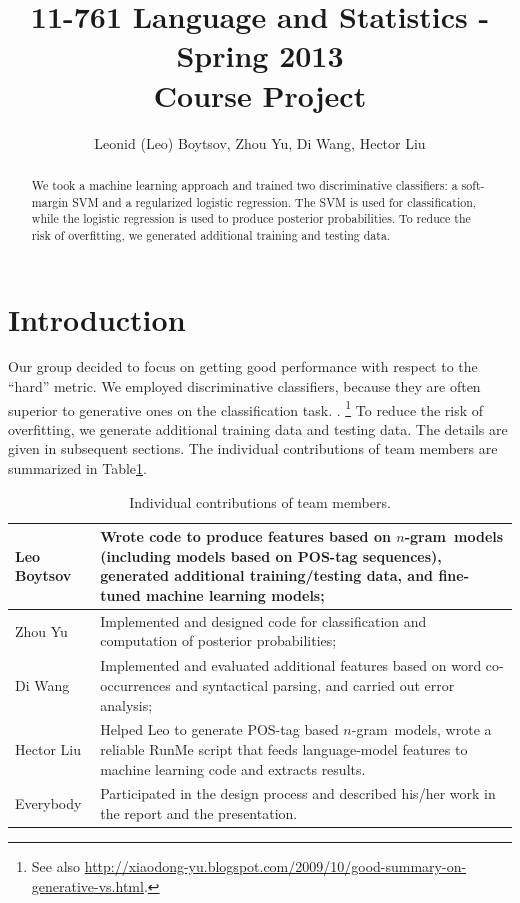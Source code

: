 \documentclass[11pt]{article}
\newcommand{\ngram}{\mbox{$n$-gram }}
\begin{document}
\title{11-761 Language and Statistics - Spring 2013\\
Course Project}
\author{Leonid (Leo) Boytsov, Zhou Yu, Di Wang, Hector Liu}
\date{}
\maketitle

\begin{abstract}
We took a machine learning approach and trained two discriminative classifiers:
a soft-margin SVM and a regularized logistic regression.
The SVM is used for classification, while the logistic regression is used to produce posterior probabilities.
To reduce the risk of overfitting, we generated additional training and testing data.
\end{abstract}

\section{Introduction}
Our group decided to focus on getting good performance with respect to the ``hard'' metric.
We employed discriminative classifiers,
because they are often superior to generative ones on the classification task. \cite{bishop2007generative}.
\footnote{See also \url{http://xiaodong-yu.blogspot.com/2009/10/good-summary-on-generative-vs.html}.}
To reduce the risk of overfitting, we generate additional training data and testing data.
The details are given in subsequent sections. The individual contributions of team members are summarized in Table\ref{TableContrib}.

\begin{table}[H]
\begin{tabular}{p{1in}|p{5in}}
\hline
Leo Boytsov &  Wrote code to produce features based on \ngram models (including models based on POS-tag sequences), generated additional training/testing data, and fine-tuned machine learning models;
\\\hline
Zhou Yu & Implemented and designed code for classification and computation of posterior probabilities;
\\\hline
Di Wang & Implemented and evaluated additional features based on word co-occurrences and syntactical parsing, and
carried out error analysis;
\\\hline
Hector Liu & Helped Leo to generate POS-tag based \ngram models, wrote a
reliable RunMe script that feeds language-model features to machine learning code
and extracts results.
\\\hline
Everybody & Participated in the design process and described his/her work
in the report and the presentation.
\\\hline
\end{tabular}

\caption{\label{TableContrib}Individual contributions of team members.}
\end{table}
\end{document}
